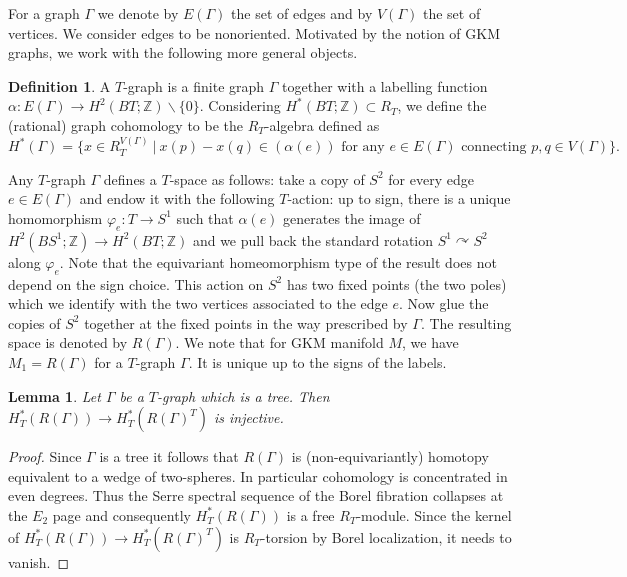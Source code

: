 \documentclass[12pt,a4paper]{article}
\newtheorem{lem}[thm]{Lemma}
\theoremstyle{definition}
\newtheorem{defn}[thm]{Definition}
\begin{document}
For a graph $\Gamma$ we denote by $E(\Gamma)$ the set of edges and by $V(\Gamma)$ the set of vertices. We consider edges to be nonoriented. Motivated by the notion of GKM graphs, we work with the following more general objects.

\begin{defn}
A $T$-graph is a finite graph $\Gamma$ together with a labelling function $\alpha\colon E(\Gamma)\rightarrow H^2(BT;\mathbb{Z})\backslash\{0\}$. Considering $H^*(BT;\mathbb{Z})\subset R_T$, we define the (rational) graph cohomology to be the $R_T$-algebra defined as
\[H^*(\Gamma)=\{x\in R_T^{V(\Gamma)}~|~ x(p)-x(q)\in (\alpha(e)) \text{ for any }e\in E(\Gamma)\text{ connecting }p,q\in V(\Gamma)\}.\]
\end{defn}

Any $T$-graph $\Gamma$ defines a $T$-space as follows: take a copy of $S^2$ for every edge $e\in E(\Gamma)$ and endow it with the following $T$-action: up to sign, there is a unique homomorphism $\varphi_e\colon T\rightarrow S^1$ such that $\alpha(e)$ generates the image of $H^2(BS^1;\mathbb{Z})\rightarrow H^2(BT;\mathbb{Z})$ and we pull back the standard rotation $S^1\curvearrowright S^2$ along $\varphi_e$.
Note that the equivariant homeomorphism type of the result does not depend on the sign choice. This action on $S^2$ has two fixed points (the two poles) which we identify with the two vertices associated to the edge $e$. Now glue the copies of $S^2$ together at the fixed points in the way prescribed by $\Gamma$. The resulting space is denoted by $R(\Gamma)$. We note that for GKM manifold $M$, we have $M_1= R(\Gamma)$ for a $T$-graph $\Gamma$. It is unique up to the signs of the labels.

\begin{lem}\label{lem:tree}
Let $\Gamma$ be a $T$-graph which is a tree. Then $H^*_T(R(\Gamma))\rightarrow H^*_T(R(\Gamma)^T)$ is injective.
\end{lem}

\begin{proof}
Since $\Gamma$ is a tree it follows that $R(\Gamma)$ is (non-equivariantly) homotopy equivalent to a wedge of two-spheres. In particular cohomology is concentrated in even degrees. Thus the Serre spectral sequence of the Borel fibration collapses at the $E_2$ page and consequently $H^*_T(R(\Gamma))$ is a free $R_T$-module. Since the kernel of $H^*_T(R(\Gamma))\rightarrow H^*_T(R(\Gamma)^T)$ is $R_T$-torsion by Borel localization, it needs to vanish.
\end{proof}
\end{document}
